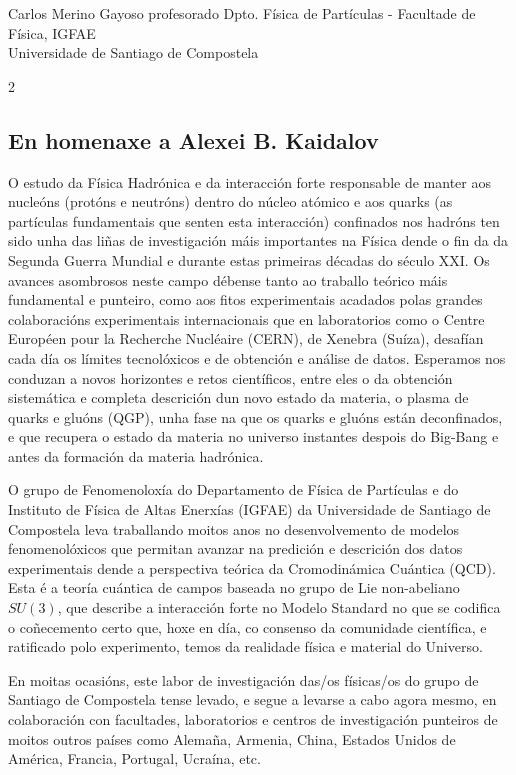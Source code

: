 \Titular*%
{Memorias de Moscova}%
{Carlos Merino Gayoso}%
{profesorado}%
{Dpto. Física de Partículas - Facultade de Física, IGFAE\\
Universidade de Santiago de Compostela}%

\begin{refsection}
\begin{multicols}{2}

\subsection*{En homenaxe a Alexei B. Kaidalov}

O estudo da Física Hadrónica e da interacción forte responsable de manter aos
nucleóns (protóns e neutróns) dentro do núcleo atómico e aos quarks (as
partículas fundamentais que senten esta interacción) confinados nos hadróns ten
sido unha das liñas de investigación máis importantes na Física dende o fin da
da Segunda Guerra Mundial e durante estas primeiras décadas do século XXI. Os
avances asombrosos neste campo débense tanto ao traballo teórico máis
fundamental e punteiro, como aos fitos experimentais acadados polas grandes
colaboracións experimentais internacionais que en laboratorios como o Centre
Européen pour la Recherche Nucléaire (CERN), de Xenebra (Suíza), desafían cada
día os límites tecnolóxicos e de obtención e análise de datos. Esperamos nos
conduzan a novos horizontes e retos científicos, entre eles o da obtención
sistemática e completa descrición dun novo estado da materia, o plasma de
quarks e gluóns (QGP), unha fase na que os quarks e gluóns están deconfinados,
e que recupera o estado da materia no universo instantes despois do Big-Bang e
antes da formación da materia hadrónica.

O grupo de Fenomenoloxía do Departamento de Física de Partículas e do Instituto
de Física de Altas Enerxías (IGFAE) da Universidade de Santiago de Compostela
leva traballando moitos anos no desenvolvemento de modelos fenomenolóxicos que
permitan avanzar na predición e descrición dos datos experimentais dende a
perspectiva teórica da Cromodinámica Cuántica (QCD). Esta é a teoría cuántica
de campos baseada no grupo de Lie non-abeliano $SU(3)$, que describe a
interacción forte no Modelo Standard no que se codifica o coñecemento certo
que, hoxe en día, co consenso da comunidade científica, e ratificado polo
experimento, temos da realidade física e material do Universo.

En moitas ocasións, este labor de investigación das/os físicas/os do grupo de
Santiago de Compostela tense levado, e segue a levarse a cabo agora mesmo, en
colaboración con facultades, laboratorios e centros de investigación punteiros
de moitos outros países como Alemaña, Armenia, China, Estados Unidos de
América, Francia, Portugal, Ucraína, etc.


\end{multicols}
\end{refsection}
